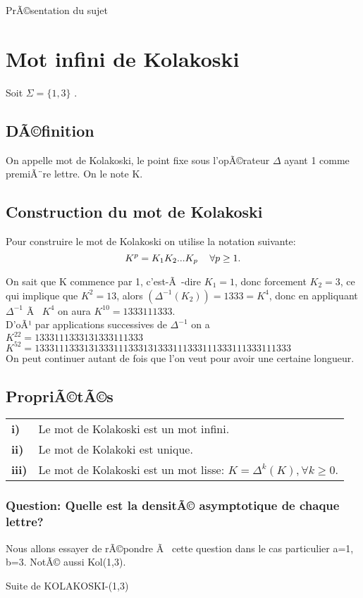 \documentclass[12pt,a4paper,oneside]{book}
\begin{document}
\begin{titlepage}
\begin{chapter}{PrÃ©sentation du sujet}
\section{Mot infini de Kolakoski}
\par Soit $\Sigma=\{1,3\}$ .
\subsection{DÃ©finition}
 \par On appelle mot de Kolakoski, le point fixe sous l'opÃ©rateur $\Delta$ ayant 1 comme premiÃ¨re lettre. On le note K.
\subsection{Construction du mot de Kolakoski}
\par Pour construire le mot de Kolakoski on utilise la notation suivante:
 $$K^p=K_1K_2...K_p \hspace{1\baselineskip} \forall p \geq 1.$$
\par On sait que K commence par 1, c'est-Ã -dire $K_1=1$, donc forcement $K_2=3$, ce qui implique que $K^2=13$, alors $(\Delta^{-1}(K_2))=1333=K^4$, donc en appliquant  
$\Delta^{-1}$ Ã  $K^4$ on aura $K^{10}=1333111333$. \\ D'oÃ¹ par applications successives de $\Delta^{-1}$ on a \\
$K^{22}=1333111333131333111333$\\
$K^{52}=1333111333131333111333131333111333111333111333111333$ \\
On peut continuer autant de fois que l'on veut pour avoir une certaine longueur.
\subsection{PropriÃ©tÃ©s}
\begin{tabular}{ll}
\textbf{i)}   & Le mot de Kolakoski est un mot infini.\\
\textbf{ii)} & Le mot de Kolakoki est unique.\\
\textbf{iii)} & Le mot de Kolakoski est un mot lisse: $K=\Delta^k(K), \forall k \geq 0$.
\end{tabular}
\subsubsection*{Question: Quelle est la densitÃ© asymptotique de chaque lettre?}
Nous allons essayer de rÃ©pondre Ã  cette question dans le cas particulier a=1, b=3. NotÃ© aussi Kol(1,3).
\end{chapter}
\begin{chapter}{Suite de KOLAKOSKI-(1,3)}

\end{chapter}
\end{titlepage}
\end{document}
